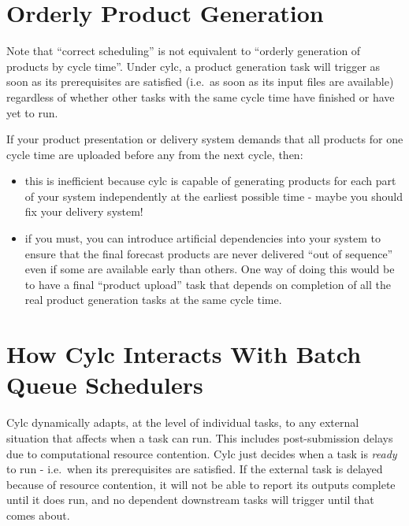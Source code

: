 \documentclass[11pt,a4paper]{article}
\begin{document}
\pagebreak
\section{Orderly Product Generation}
\label{OrderlyProductGeneration}

Note that ``correct scheduling'' is not equivalent to ``orderly
generation of products by cycle time''.  Under cylc, a product
generation task will trigger as soon as its prerequisites are satisfied 
(i.e.\ as soon as its input files are available) regardless of
whether other tasks with the same cycle time have finished or have yet
to run. 

If your product presentation or delivery system demands that all
products for one cycle time are uploaded before any from the next
cycle, then:

\begin{itemize}
    \item this is inefficient because cylc is capable of generating products 
        for each part of your system independently at the earliest
        possible time - maybe you should fix your delivery system!
    \item if you must, you can introduce artificial dependencies into
        your system to ensure that the final forecast products are never
        delivered ``out of sequence'' even if some are available early
        than others.  One way of doing this would be to have a final
        ``product upload'' task that depends on completion of all the
        real product generation tasks at the same cycle time.
\end{itemize}

\pagebreak
\section{How Cylc Interacts With Batch Queue Schedulers}
\label{HowCylcInteractsWithBatchQueueSchedulers}

Cylc dynamically adapts, at the level of individual tasks, to any
external situation that affects when a task can run. This includes
post-submission delays due to computational resource contention. Cylc
just decides when a task is {\em ready} to run - i.e.\ when its
prerequisites are satisfied.  If the external task is delayed because of
resource contention, it will not be able to report its outputs complete
until it does run, and no dependent downstream tasks will trigger until
that comes about.


\pagebreak
\appendix
\end{document}
